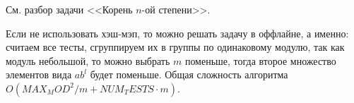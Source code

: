 См. разбор задачи <<Корень $n$-ой степени>>.

Если не использовать хэш-мэп,
то можно решать задачу в оффлайне, а именно:
считаем все тесты, сгруппируем их в группы по
одинаковому модулю, так как модуль небольшой,
то можно выбрать $m$ поменьше, тогда второе множество
элементов вида $ab^l$ будет поменьше. Общая сложность
алгоритма $O(MAX_MOD^2/m + NUM_TESTS \cdot m)$.
